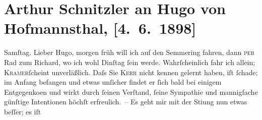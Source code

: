 

         
         \renewcommand{\erwaehntePersonen}{Personen: Richard Beer-Hofmann, Otto Brahm, Hugo von Hofmannsthal, Alfred Kerr, Leopold Kramer}
         \renewcommand{\erwaehnteInstitutionen}{Institutionen: Deutsches Theater Berlin}
         \renewcommand{\erwaehnteOrte}{Orte: Hinterbrühl, Kärnten, Semmering, Steindorf am Ossiacher See, Wien}
         \renewcommand{\erwaehnteWerke}{}
               \section[Arthur Schnitzler an Hugo von Hofmannsthal, {[}4. 6. 1898{]}]{ Arthur Schnitzler an Hugo von Hofmannsthal, {[}4. 6. 1898{]}}\nopagebreak{}\rehead{ }\begin{ledgroupsized}[t]{13cm}\normalsize\beginnumbering \toendnotes[C]{\smallbreak\pagebreak[2]} 
\pstart
           \raggedleft{}{\pb}Samſtag.\pend
           \pstart
           Lieber Hugo, morgen früh will ich auf den Semmering fahren, dann \textsc{per} Rad zum Richard, wo ich wohl
                        Dinſtag{ }ſein werde. Wahrſcheinlich fahr ich allein;
                        \textsc{Kramer}ſcheint {\pb}unverläßlich. Daſs Sie \textsc{Kerr} nicht kennen gelernt haben, iſt ſchade; im Anfang befangen und etwas
                    unſicher findet er ſich bald bei einigem Entgegenko{\geminationm}en und wirkt durch ſeinen Verſtand, ſeine Sympathie und mannigfache {\pb}günſtige Intentionen höchſt erfreulich. –\pend
           \pstart
           Es geht mir mit der Sti{\geminationm}ung nun etwas beſſer; es iſt

\end{ledgroupsized}
